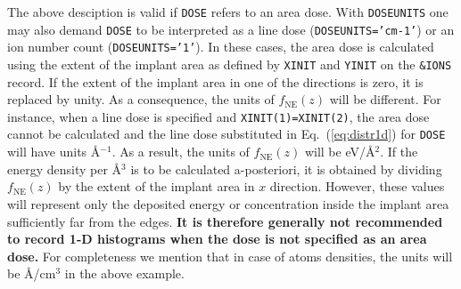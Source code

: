 The above desciption is valid if \texttt{DOSE} refers to an area dose. With
\texttt{DOSEUNITS} one may also demand \texttt{DOSE} to be interpreted as a line
dose (\texttt{DOSEUNITS='cm-1'}) or an ion number count
(\texttt{DOSEUNITS='1'}). In these cases, the area dose is calculated using the
extent of the implant area as defined by \texttt{XINIT} and \texttt{YINIT} on
the \texttt{\&IONS} record. If the extent of the implant area in one of the
directions is zero, it is replaced by unity. As a consequence, the units of
$f_\mathrm{NE}(z)$ will be different. For instance, when a line dose is
specified and \texttt{XINIT(1)=XINIT(2)}, the area dose cannot be calculated and
the line dose substituted in Eq.~(\ref{eq:distr1d}) for \texttt{DOSE} will have
units {\AA}$^{-1}$. As a result, the units of $f_\mathrm{NE}(z)$ will be 
eV/{\AA}$^2$. If the energy density per {\AA}$^3$ is to be calculated
a-posteriori, it is obtained by dividing $f_\mathrm{NE}(z)$ by the extent of the
implant area in $x$ direction. However, these values will represent only the
deposited energy or concentration inside the implant area sufficiently far from
the edges. \textbf{It is therefore generally not recommended to record 1-D
histograms when the dose is not specified as an area dose.} For completeness we
mention that in case of atoms densities, the units will be {\AA}/cm$^3$ in the
above example. 


